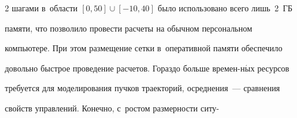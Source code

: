 \begin{multicols}{2}
шагами в~об\-ласти $[0,50]\cup [-10,40]$ было использовано всего лишь~2~ГБ 


памяти, что позволило провести расчеты на обычном персональном 


компьютере. При этом размещение сетки в~оперативной памяти обеспечило 


довольно быст\-рое проведение расчетов. Гораздо больше времен-\linebreak н$\acute{\mbox{ы}}$х ресурсов 


требуется для моделирования пучков траекторий, осред\-не\-ния~--- срав\-не\-ния 


свойств управ\-ле\-ний. Конечно, с~рос\-том размерности ситу-\linebreak\vspace*{-12pt}





\pagebreak





\end{multicols}





